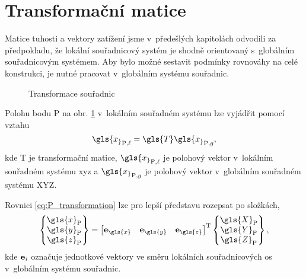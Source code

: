 \section{Transformační matice}

Matice tuhosti a vektory zatížení jsme v~předešlých kapitolách odvodili za předpokladu, že lokální souřadnicový systém je shodně orientovaný s~globálním souřadnicovým systémem. Aby bylo možné sestavit podmínky rovnováhy na celé konstrukci, je nutné pracovat v~globálním systému souřadnic.

\begin{figure}[H]
    
    \caption{Transformace souřadnic}
    \label{fig:coordinate_transformation}
\end{figure}

Polohu bodu $\mathrm{P}$ na obr. \ref{fig:coordinate_transformation} v~lokálním souřadném systému lze vyjádřit pomocí vztahu
\begin{equation} \label{eq:P_transformation}
    \gls{x_}_{\mathrm{P},\ell} = \gls{T}  \gls{x_}_{\mathrm{P},g},
\end{equation}
kde \gls{T} je transformační matice, $\gls{x_}_{\mathrm{P},\ell}$ je polohový vektor v~lokálním souřadném systému \gls{x}\gls{y}\gls{z} a $\gls{x_}_{\mathrm{P},g}$ je polohový vektor v~globálním souřadném systému \gls{X}\gls{Y}\gls{Z}.

Rovnici \ref{eq:P_transformation} lze pro lepší představu rozepsat po složkách,
\begin{equation}
    \begin{Bmatrix}
        \gls{x}_{\mathrm{P}} \\
        \gls{y}_{\mathrm{P}} \\
        \gls{z}_{\mathrm{P}}
    \end{Bmatrix}
    =
    \begin{bmatrix}
        \matr{e}_{\gls{x}} &
        \matr{e}_{\gls{y}} &
        \matr{e}_{\gls{z}}
    \end{bmatrix}^{\mathrm{T}}
    \begin{Bmatrix}
        \gls{X}_{\mathrm{P}} \\
        \gls{Y}_{\mathrm{P}} \\
        \gls{Z}_{\mathrm{P}}
    \end{Bmatrix},
\end{equation}
kde $\mathbf{e}_i$ označuje jednotkové vektory ve směru lokálních souřadnicových os v~globálním systému souřadnic.

